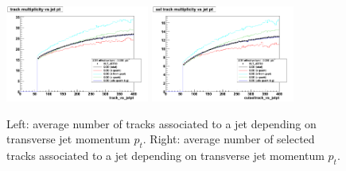 \begin{figure}[h!]
\centering
\includegraphics[width=0.42\textwidth]{figures/track_vs_jetpt_Linear.png}
\includegraphics[width=0.42\textwidth]{figures/cutseltrack_vs_jetpt_Linear.png}
\caption{Left: average number of tracks associated to a jet depending on transverse jet momentum $p_t$. Right:  average number of selected tracks associated to a jet depending on transverse jet momentum $p_t$.}
\label{fig:trackMultVsPt}
\end{figure}
